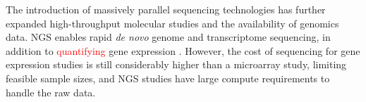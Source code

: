 The introduction of massively parallel sequencing technologies has further expanded high-throughput molecular studies and the availability of \glspl{genomic} data. \gls{NGS} enables rapid \textit{de novo} \gls{genome} and \gls{transcriptome} sequencing, in addition to \textcolor{red}{quantifying} \gls{gene expression} \citep{Goodwin2016}.  %
However, the cost of sequencing for \gls{gene expression} studies is still considerably higher than a \gls{microarray} study, limiting feasible sample sizes, and
\gls{NGS} studies have large compute requirements to handle the raw data. %
%
